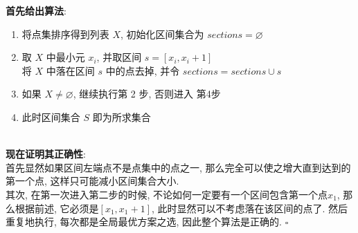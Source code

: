 \documentclass[UTF8]{article}
\newcommand{\jumpLine} {\hspace*{\fill} \\}
\begin{document}
\noindent \textbf{首先给出算法}: 
\begin{center}
\begin{enumerate}[1. ]
	\item 将点集排序得到列表 $X$, 初始化区间集合为 $sections = \varnothing$
	\item 取 $X$ 中最小元 $x_i$, 并取区间 $s = [x_i, x_i+1]$\\
	将 $X$ 中落在区间 $s$ 中的点去掉, 并令 $sections = sections\cup s$
	\item 如果 $X\not=\varnothing$, 继续执行第 2 步, 否则进入 第4步
	\item 此时区间集合 $S$ 即为所求集合
\end{enumerate}
\end{center}
\jumpLine
\noindent \textbf{现在证明其正确性}:\\
首先显然如果区间左端点不是点集中的点之一, 那么完全可以使之增大直到达到的第一个点, 这样只可能减小区间集合大小.\\
其次, 在第一次进入第二步的时候, 不论如何一定要有一个区间包含第一个点$x_1$, 那么根据前述, 它必须是$[x_1,x_1+1]$, 此时显然可以不考虑落在该区间的点了. 然后重复地执行, 每次都是全局最优方案之选, 因此整个算法是正确的. 
\hfill $\square$

\newpage
\end{document}
